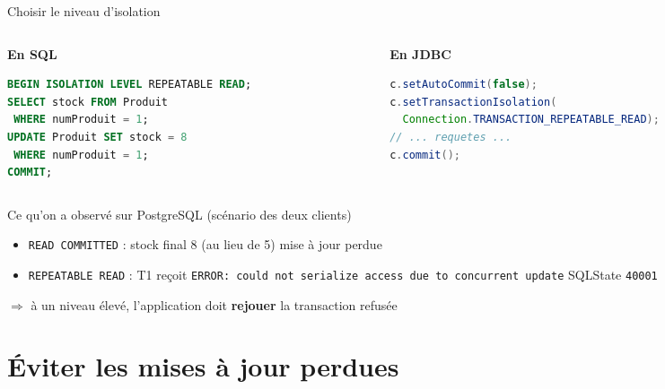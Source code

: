 \documentclass[aspectratio=169,10pt]{beamer}
\begin{document}
\begin{frame}[fragile]{Choisir le niveau d'isolation}
  \begin{columns}[T]
    \begin{column}{0.48\textwidth}
      \textbf{En SQL}
\begin{lstlisting}[language=SQL]
BEGIN ISOLATION LEVEL REPEATABLE READ;
SELECT stock FROM Produit
 WHERE numProduit = 1;
UPDATE Produit SET stock = 8
 WHERE numProduit = 1;
COMMIT;
\end{lstlisting}
    \end{column}
    \begin{column}{0.48\textwidth}
      \textbf{En JDBC}
\begin{lstlisting}[language=Java]
c.setAutoCommit(false);
c.setTransactionIsolation(
  Connection.TRANSACTION_REPEATABLE_READ);
// ... requetes ...
c.commit();
\end{lstlisting}
    \end{column}
  \end{columns}
  \vspace{2mm}
  \begin{block}{Ce qu'on a observ\'e sur PostgreSQL (sc\'enario des deux clients)}
    \begin{itemize}
      \item \texttt{READ COMMITTED} : stock final 8 (au lieu de 5) \hfill \alert{mise \`a jour perdue}
      \item \texttt{REPEATABLE READ} : T1 re\c{c}oit \texttt{ERROR: could not serialize access due to concurrent update} \hfill SQLState \texttt{40001}
    \end{itemize}
    $\Rightarrow$ \`a un niveau \'elev\'e, l'application doit \textbf{rejouer} la transaction refus\'ee
  \end{block}
\end{frame}

\section{\'Eviter les mises \`a jour perdues}
\end{document}
